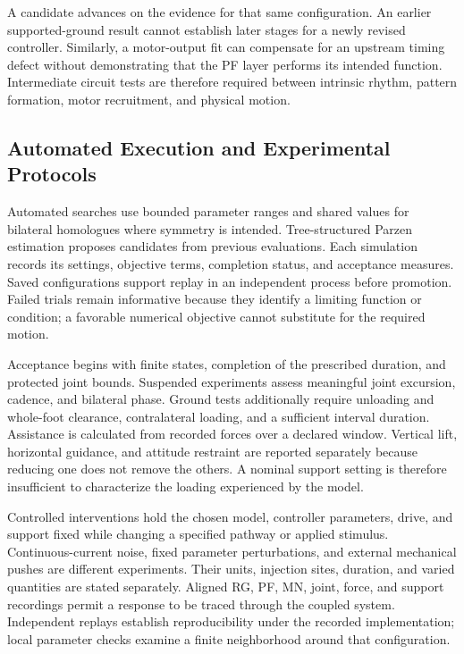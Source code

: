 A candidate advances on the evidence for that same configuration. An earlier supported-ground result cannot establish later stages for a newly revised controller. Similarly, a motor-output fit can compensate for an upstream timing defect without demonstrating that the PF layer performs its intended function. Intermediate circuit tests are therefore required between intrinsic rhythm, pattern formation, motor recruitment, and physical motion.

\subsection{Automated Execution and Experimental Protocols}\label{sec:sns_repeatability_main}\label{sec:sns_w2l_methods}

Automated searches use bounded parameter ranges and shared values for bilateral homologues where symmetry is intended. Tree-structured Parzen estimation proposes candidates from previous evaluations. Each simulation records its settings, objective terms, completion status, and acceptance measures. Saved configurations support replay in an independent process before promotion. Failed trials remain informative because they identify a limiting function or condition; a favorable numerical objective cannot substitute for the required motion.

Acceptance begins with finite states, completion of the prescribed duration, and protected joint bounds. Suspended experiments assess meaningful joint excursion, cadence, and bilateral phase. Ground tests additionally require unloading and whole-foot clearance, contralateral loading, and a sufficient interval duration. Assistance is calculated from recorded forces over a declared window. Vertical lift, horizontal guidance, and attitude restraint are reported separately because reducing one does not remove the others. A nominal support setting is therefore insufficient to characterize the loading experienced by the model.

Controlled interventions hold the chosen model, controller parameters, drive, and support fixed while changing a specified pathway or applied stimulus. Continuous-current noise, fixed parameter perturbations, and external mechanical pushes are different experiments. Their units, injection sites, duration, and varied quantities are stated separately. Aligned RG, PF, MN, joint, force, and support recordings permit a response to be traced through the coupled system. Independent replays establish reproducibility under the recorded implementation; local parameter checks examine a finite neighborhood around that configuration.

